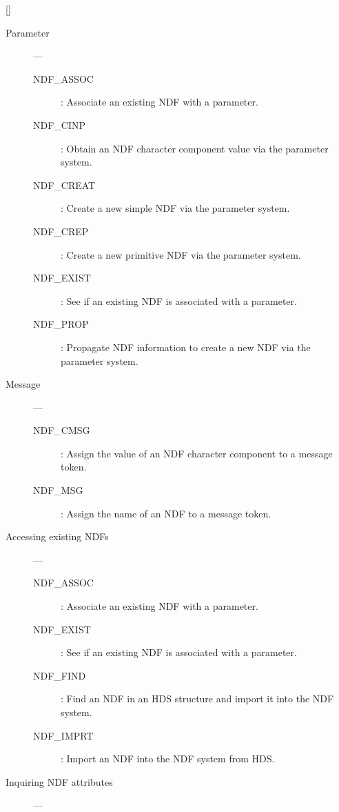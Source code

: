 \hfill []

\vspace{2mm}

\begin{description}
\item [Parameter] ---

\begin{description}
\item [NDF\_ASSOC] : Associate an existing NDF with a parameter.
\item [NDF\_CINP] : Obtain an NDF character component value via the parameter system.
\item [NDF\_CREAT] : Create a new simple NDF via the parameter system.
\item [NDF\_CREP] : Create a new primitive NDF via the parameter system.
\item [NDF\_EXIST] : See if an existing NDF is associated with a parameter.
\item [NDF\_PROP] : Propagate NDF information to create a new NDF via the parameter system.
\end{description}

\item [Message] ---

\begin{description}
\item [NDF\_CMSG] : Assign the value of an NDF character component to a message token.
\item [NDF\_MSG] : Assign the name of an NDF to a message token.
\end{description}

\item [Accessing existing NDFs] ---

\begin{description}
\item [NDF\_ASSOC] : Associate an existing NDF with a parameter.
\item [NDF\_EXIST] : See if an existing NDF is associated with a parameter.
\item [NDF\_FIND] : Find an NDF in an HDS structure and import it into the NDF system.
\item [NDF\_IMPRT] : Import an NDF into the NDF system from HDS.
\end{description}

\item [Inquiring NDF attributes] ---


\end{description}
